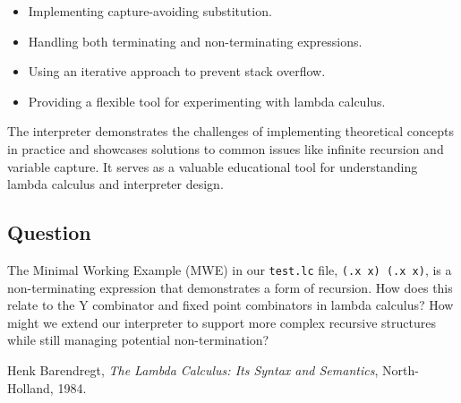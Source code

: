 \documentclass{article}
\theoremstyle{theorem}
\theoremstyle{definition}
\theoremstyle{remark}
\begin{document}
\begin{itemize}
    \item Implementing capture-avoiding substitution.
    \item Handling both terminating and non-terminating expressions.
    \item Using an iterative approach to prevent stack overflow.
    \item Providing a flexible tool for experimenting with lambda calculus.
\end{itemize}

The interpreter demonstrates the challenges of implementing theoretical concepts in practice and showcases solutions to common issues like infinite recursion and variable capture. It serves as a valuable educational tool for understanding lambda calculus and interpreter design.

\subsection{Question}

The Minimal Working Example (MWE) in our \texttt{test.lc} file, \texttt{(\x.x x) (\x.x x)}, is a non-terminating expression that demonstrates a form of recursion. How does this relate to the Y combinator and fixed point combinators in lambda calculus? How might we extend our interpreter to support more complex recursive structures while still managing potential non-termination?

\begin{thebibliography}{9}
 Henk Barendregt, \emph{The Lambda Calculus: Its Syntax and Semantics}, North-Holland, 1984.
\end{thebibliography}
\end{document}
